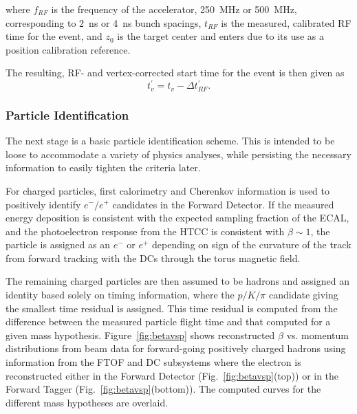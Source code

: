 \noindent
where $f_{RF}$ is the frequency of the accelerator, 250~MHz or 500~MHz, corresponding to 2~ns or 4~ns bunch
spacings, $t_{RF}$ is the measured, calibrated RF time for the event, and $z_0$ is the target center and enters
due to its use as a position calibration reference.

The resulting, RF- and vertex-corrected start time for the event is then given as
\begin{equation}\label{eq:starttime}
t^{\prime}_v = t_v - \Delta t^{\prime}_{RF}.
\end{equation}

\subsubsection{Particle Identification}

The next stage is a basic particle identification scheme.  This is intended to be loose to accommodate a variety of
physics analyses, while persisting the necessary information to easily tighten the criteria later.

For charged particles, first calorimetry and Cherenkov information is used to positively identify $e^-/e^+$
candidates in the Forward Detector. If the measured energy deposition is consistent with the expected sampling
fraction of the ECAL, and the photoelectron response from the HTCC is consistent with $\beta\sim1$, the particle
is assigned as an $e^-$ or $e^+$ depending on sign of the curvature of the track from forward tracking with the
DCs through the torus magnetic field.

The remaining charged particles are then assumed to be hadrons and assigned an identity based solely on timing
information, where the $p/K/\pi$ candidate giving the smallest time residual is assigned. This time residual is
computed from the difference between the measured particle flight time and that computed for a given mass
hypothesis. Figure~\ref{fig:betavsp} shows reconstructed $\beta$ vs. momentum distributions from beam data
for forward-going positively charged hadrons using information from the FTOF and DC subsystems where the
electron is reconstructed either in the Forward Detector (Fig.~\ref{fig:betavsp}(top)) or in the Forward Tagger
(Fig.~\ref{fig:betavsp}(bottom)). The computed curves for the different mass hypotheses are overlaid.

\vfil

